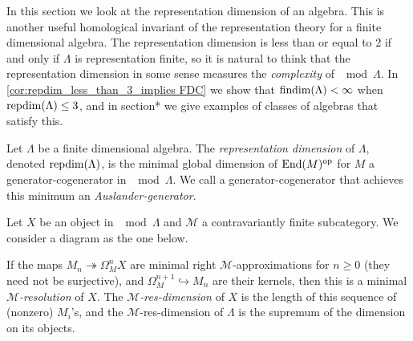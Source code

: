 
In this section we look at the representation dimension of an algebra. This is another useful homological invariant of the representation theory for a finite dimensional algebra. The representation dimension is less than or equal to 2 if and only if $\Lambda$ is representation finite, so it is natural to think that the representation dimension in some sense measures the \textit{complexity} of $\mod\Lambda$. In \cref{cor:repdim_less_than_3_implies FDC} we show that $\operatorname{findim}(\Lambda) < \infty$ when $\operatorname{repdim}(\Lambda) \leq 3$, and in section* we give examples of classes of algebras that satisfy this.

\begin{defn}
	Let $\Lambda$ be a finite dimensional algebra. The \emph{representation dimension} of $\Lambda$, denoted $\operatorname{repdim}(\Lambda)$, is the minimal global dimension of $\operatorname{End}(M)^{\operatorname{op}}$ for $M$ a generator-cogenerator in $\mod\Lambda$. We call a generator-cogenerator that achieves this minimum an \emph{Auslander-generator}.
\end{defn}

\begin{defn}
	Let $X$ be an object in $\mod\Lambda$ and $\mathcal M$ a contravariantly finite subcategory. We consider a diagram as the one below.
	\begin{center}
	\end{center}
	If the maps $M_n \twoheadrightarrow \Omega_M^nX$ are minimal right $\mathcal M$-approximations for $n\geq 0$ (they need not be surjective), and $\Omega_M^{n+1} \hookrightarrow M_n$ are their kernels, then this is a minimal \emph{$\mathcal M$-resolution} of $X$. The \emph{$\mathcal M$-res-dimension} of $X$ is the length of this sequence of (nonzero) $M_i$'s, and the $\mathcal M$-res-dimension of $\Lambda$ is the supremum of the dimension on its objects.
\end{defn}

